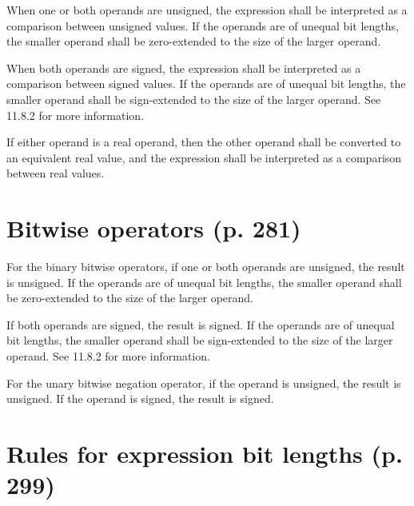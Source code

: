 \documentclass{article}
\begin{document}
\textelp{}

When one or both operands are unsigned, the expression shall be interpreted as a
comparison between unsigned values.
  {
    \color{red}
    If the operands are of unequal bit
    lengths, the smaller operand shall be zero-extended to the size of the larger
    operand.
  }

When both operands are signed, the expression shall be interpreted as a
comparison between signed values.
  {
    \color{red}
    If the operands are of unequal bit
    lengths, the smaller operand shall be sign-extended to the size of the larger
    operand. See 11.8.2 for more information.
  }

If either operand is a real operand, then the other operand shall be converted
to an equivalent real value, and the expression shall be interpreted as a
comparison between real values.

\textelp{}

\setcounter{section}{7}

\section{Bitwise operators (p. 281)}

\textelp{}

For the binary bitwise operators, if one or both operands are unsigned, the
result is unsigned.
  {
    \color{red}
    If the operands are of unequal bit lengths, the smaller
    operand shall be zero-extended to the size of the larger operand.
  }

If both operands are signed, the result is signed.
  {
    \color{red}
    If the operands are of
    unequal bit lengths, the smaller operand shall be sign-extended to the size of
    the larger operand. See 11.8.2 for more information.
  }

For the unary bitwise negation operator, if the operand is unsigned, the result
is unsigned. If the operand is signed, the result is signed.

\textelp{}

\renewcommand{\thesection}{11.6.\arabic{section}}
\setcounter{section}{0}

\section{Rules for expression bit lengths (p. 299)}
\end{document}
